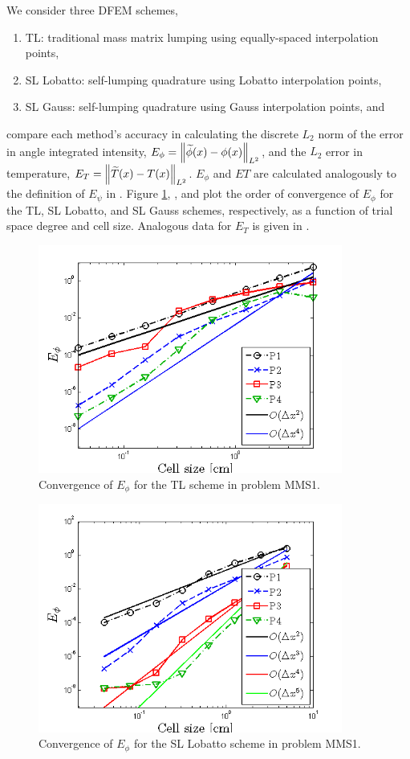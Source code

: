 We consider three DFEM schemes,
\begin{enumerate}
\item TL: traditional mass matrix lumping using equally-spaced interpolation points,
\item SL Lobatto: self-lumping quadrature using Lobatto interpolation points,
\item SL Gauss: self-lumping quadrature using Gauss interpolation points, and
\end{enumerate}  
compare each method's accuracy in calculating the discrete $L_2$ norm of the error in angle integrated intensity, $E_{\phi} = \left\lVert  \widetilde{\phi}(x) - \phi(x) \right\rVert_{L^2}$, and the $L_2$ error in temperature, $E_T = \left\lVert  \widetilde{T}(x) - T(x)  \right\rVert_{L^2}$.
$E_{\phi}$ and $E{T}$ are calculated analogously to the definition of $E_{\psi}$ in .
Figure \ref{fig:mms1_tl_phi}, , and  plot the order of convergence of $E_{\phi}$ for the TL, SL Lobatto, and SL Gauss schemes, respectively, as a function of trial space degree and cell size.
Analogous data for $E_{T}$ is given in .
\begin{figure}[!ht]
\centering
\includegraphics[width=10cm]{chapter6_grey_radtran/Dissertation_Data/MMS2_TL_phi_L2.png}
\caption{Convergence of $E_{\phi}$ for the TL scheme in problem MMS1.}
\label{fig:mms1_tl_phi}
\end{figure}
%
%
\begin{figure}[!ht]
\centering
\includegraphics[width=10cm]{chapter6_grey_radtran/Dissertation_Data/MMS2_SLXS_Lobatto_phi_L2.png}
\caption{Convergence of $E_{\phi}$ for the SL Lobatto scheme in problem MMS1.}
\label{fig:mms1_lobatto_phi}
\end{figure}
